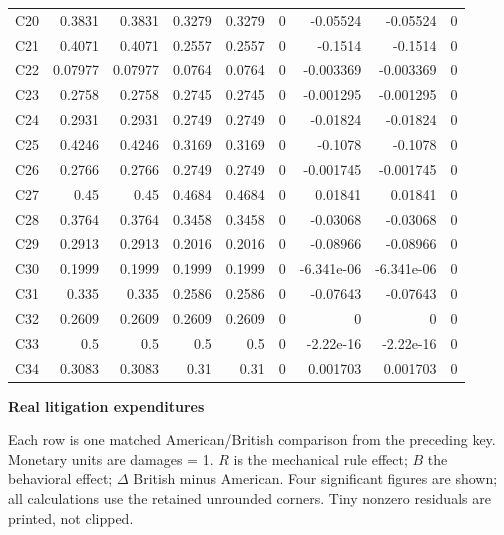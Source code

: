 \documentclass[10pt]{article}
\begin{document}
\begin{longtable}{@{}lrrrrrrrr@{}}
C20 & 0.3831 & 0.3831 & 0.3279 & 0.3279 & 0 & -0.05524 & -0.05524 & 0\\[1pt]
C21 & 0.4071 & 0.4071 & 0.2557 & 0.2557 & 0 & -0.1514 & -0.1514 & 0\\[1pt]
C22 & 0.07977 & 0.07977 & 0.0764 & 0.0764 & 0 & -0.003369 & -0.003369 & 0\\[1pt]
C23 & 0.2758 & 0.2758 & 0.2745 & 0.2745 & 0 & -0.001295 & -0.001295 & 0\\[1pt]
C24 & 0.2931 & 0.2931 & 0.2749 & 0.2749 & 0 & -0.01824 & -0.01824 & 0\\[1pt]
C25 & 0.4246 & 0.4246 & 0.3169 & 0.3169 & 0 & -0.1078 & -0.1078 & 0\\[1pt]
C26 & 0.2766 & 0.2766 & 0.2749 & 0.2749 & 0 & -0.001745 & -0.001745 & 0\\[1pt]
C27 & 0.45 & 0.45 & 0.4684 & 0.4684 & 0 & 0.01841 & 0.01841 & 0\\[1pt]
C28 & 0.3764 & 0.3764 & 0.3458 & 0.3458 & 0 & -0.03068 & -0.03068 & 0\\[1pt]
C29 & 0.2913 & 0.2913 & 0.2016 & 0.2016 & 0 & -0.08966 & -0.08966 & 0\\[1pt]
C30 & 0.1999 & 0.1999 & 0.1999 & 0.1999 & 0 & -6.341e-06 & -6.341e-06 & 0\\[1pt]
C31 & 0.335 & 0.335 & 0.2586 & 0.2586 & 0 & -0.07643 & -0.07643 & 0\\[1pt]
C32 & 0.2609 & 0.2609 & 0.2609 & 0.2609 & 0 & 0 & 0 & 0\\[1pt]
C33 & 0.5 & 0.5 & 0.5 & 0.5 & 0 & -2.22e-16 & -2.22e-16 & 0\\[1pt]
C34 & 0.3083 & 0.3083 & 0.31 & 0.31 & 0 & 0.001703 & 0.001703 & 0\\[1pt]
\end{longtable}\normalsize
\newpage
{\LARGE\bfseries Real litigation expenditures}\par\medskip
Each row is one matched American/British comparison from the preceding key. Monetary units are damages = 1. $R$ is the mechanical rule effect; $B$ the behavioral effect; $\Delta$ British minus American. Four significant figures are shown; all calculations use the retained unrounded corners. Tiny nonzero residuals are printed, not clipped.\par\medskip
\end{document}
